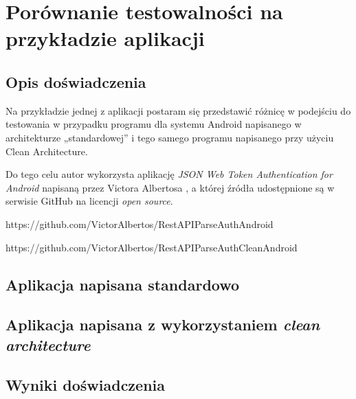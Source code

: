 \chapter{Porównanie testowalności na przykładzie aplikacji}
\label{analiza_testow}

\section{Opis doświadczenia}
Na przykładzie jednej z aplikacji postaram się przedstawić różnicę w podejściu do testowania w przypadku programu dla systemu Android napisanego w architekturze „standardowej” i tego samego programu napisanego przy użyciu Clean Architecture.

Do tego celu autor wykorzysta aplikację \textit{JSON Web Token Authentication for Android} napisaną przez Victora Albertosa , a której źródła udostępnione są w serwisie GitHub na licencji \textit{open source}.

https://github.com/VictorAlbertos/RestAPIParseAuthAndroid

https://github.com/VictorAlbertos/RestAPIParseAuthCleanAndroid

\section{Aplikacja napisana standardowo}

\section{Aplikacja napisana z wykorzystaniem \textit{clean architecture}}

\section{Wyniki doświadczenia}
